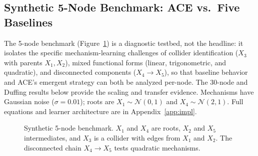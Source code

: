 \documentclass{article}
\theoremstyle{plain}
\theoremstyle{definition}
\theoremstyle{remark}
\begin{document}
\subsection{Synthetic 5-Node Benchmark: ACE vs.\ Five Baselines}
\label{sec:results-main}

The 5-node benchmark (Figure~\ref{fig:synthetic-scm}) is a diagnostic testbed, not the headline: it isolates the specific mechanism-learning challenges of collider identification ($X_3$ with parents $X_1, X_2$), mixed functional forms (linear, trigonometric, and quadratic), and disconnected components ($X_4 \to X_5$), so that baseline behavior and ACE's emergent strategy can both be analyzed per-node. The 30-node and Duffing results below provide the scaling and transfer evidence. Mechanisms have Gaussian noise ($\sigma = 0.01$); roots are $X_1 \sim \mathcal{N}(0,1)$ and $X_4 \sim \mathcal{N}(2,1)$. Full equations and learner architecture are in Appendix~\ref{app:impl}.

\begin{figure}[t]
\centering
{}
\caption{Synthetic 5-node benchmark. $X_1$ and $X_4$ are roots, $X_2$ and $X_5$ intermediates, and $X_3$ is a collider with edges from $X_1$ and $X_2$. The disconnected chain $X_4 \to X_5$ tests quadratic mechanisms.}
\label{fig:synthetic-scm}
\end{figure}
\end{document}
